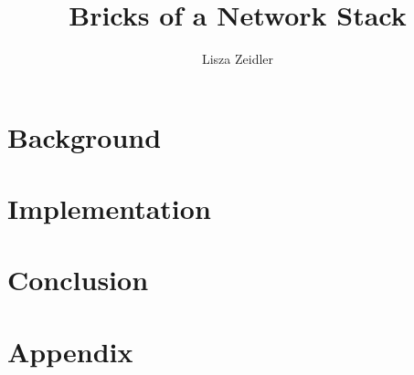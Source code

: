 \documentclass[diplominf, bibnum, lof, lot]{zihpub}
\author{Lisza Zeidler}
\title{Bricks of a Network Stack}
\begin{document}
\begin{thesisdocument}

%

\chapter{Background}
\label{Chapter:Background}


\chapter{Implementation}
\label{Chapter:Implementation}


\label{Chapter:Benchmarks}
%

\label{Chapter:Related}
%


\chapter{Conclusion}
\label{Chapter:Discussion}


\appendix
\chapter{Appendix}
\label{Appendix}

\end{thesisdocument}
\end{document}
